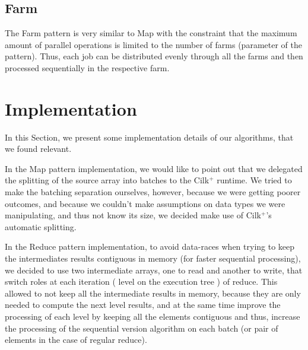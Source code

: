 \documentclass[conference,compsoc]{IEEEtran}
\begin{document}

\subsection{Farm}
The Farm pattern is very similar to Map with the constraint that the maximum amount of parallel operations is limited to the number of farms (parameter of the pattern). Thus, each job can be distributed evenly through all the farms and then processed sequentially in the respective farm.

\section{Implementation} \label{Implementation}

In this Section, we present some implementation details of our algorithms, that we found relevant.

In the Map pattern implementation, we would like to point out that we delegated the splitting of the source array into batches to the Cilk$^+$ runtime.
We tried to make the batching separation ourselves, however, because we were getting poorer outcomes, and because we couldn't make assumptions on data types we were manipulating, and thus not know its size, we decided make use of Cilk$^+$'s automatic splitting.



In the Reduce pattern implementation, to avoid data-races when trying to keep the intermediates results contiguous in memory (for faster sequential processing), we decided to use two intermediate arrays, one to read and another to write, that switch roles at each iteration ( level on the execution tree ) of reduce. This allowed to not keep all the intermediate results in memory, because they are only needed to compute the next level results, and at the same time improve the processing of each level by keeping all the elements contiguous and thus, increase the processing of the sequential version algorithm on each batch (or pair of elements in the case of regular reduce).
\end{document}
